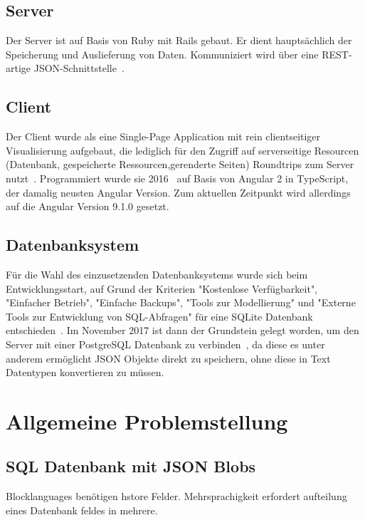 \subsection{Server}

Der Server ist auf Basis von Ruby mit Rails gebaut. Er dient hauptsächlich der Speicherung und Auslieferung von Daten. 
Kommuniziert wird über eine REST-artige JSON-Schnittstelle~\cite[94]{riemer2016}. 

\subsection{Client}

Der Client wurde als eine Single-Page Application mit rein clientseitiger Visualisierung aufgebaut, 
die lediglich für den Zugriff auf serverseitige Resourcen  (Datenbank, gespeicherte Ressourcen,gerenderte Seiten) Roundtrips zum Server nutzt~\cite[94-95]{riemer2016}. 
Programmiert wurde sie 2016~\cite[1]{riemer2016} auf Basis von Angular 2 in TypeScript, der damalig neusten Angular Version. 
Zum aktuellen Zeitpunkt wird allerdings auf die Angular Version 9.1.0 gesetzt.

\subsection{Datenbanksystem} 

Für die Wahl des einzusetzenden Datenbanksystems wurde sich beim Entwicklungsstart, auf Grund der Kriterien "Kostenlose Verfügbarkeit", 
"Einfacher Betrieb", "Einfache Backups", "Tools zur Modellierung" und "Externe Tools zur Entwicklung von SQL-Abfragen"
 für eine SQLite Datenbank entschieden~\cite[99-100]{riemer2016}. Im November 2017 ist dann der Grundstein gelegt worden, 
 um den Server mit einer PostgreSQL Datenbank zu verbinden~\cite{riemerPostgresCommit}, da diese es unter anderem ermöglicht JSON Objekte direkt zu speichern,
 ohne diese in Text Datentypen konvertieren zu müssen.


\section{Allgemeine Problemstellung}

\subsection{SQL Datenbank mit JSON Blobs}
Blocklanguages benötigen hstore Felder. Mehrsprachigkeit erfordert aufteilung eines Datenbank feldes in mehrere.


